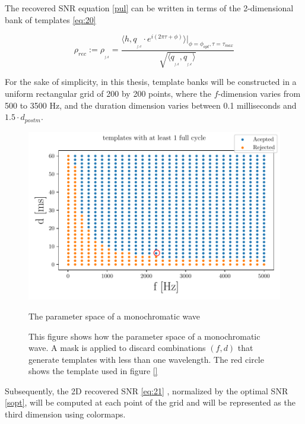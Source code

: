 The recovered SNR equation \ref{pul} can be written in terms of the 2-dimensional bank of templates \ref{eq:20}

\begin{equation}\label{eq:21}
\rho_{rec} := \rho_{_{_{f,d}}} = \frac{\langle h, q_{_{_{f,d}}}\cdot e^{i(2\pi \tau+\phi)}\rangle \bigg\rvert_{\phi =\phi_{opt},\tau =\tau_{max}}}{\sqrt{\langle  q_{_{_{f,d}}},q_{_{_{f,d}}} \rangle}}
\end{equation}


For the sake of simplicity, in this thesis, template banks will be constructed in a uniform rectangular grid of 200 by 200 points, where the $f$-dimension varies from 500 to 3500 Hz, and the duration dimension varies between 0.1 milliseconds and $1.5 \cdot d_{postm}$. 

\begin{figure}[!htb]
\centering
\includegraphics[scale=0.8]{images/Data_analysis/results/param_space.pdf}
\captionsetup{width=0.8\textwidth}
\caption{The parameter space of a monochromatic wave}
\caption*{This figure shows how the parameter space of a monochromatic wave. A mask is applied to discard combinations $(f,d)$ that generate templates with less than one wavelength. The red circle shows the template used in figure \ref{}}
\end{figure}
\FloatBarrier


Subsequently, the 2D recovered SNR \ref{eq:21} , normalized by the optimal SNR \ref{sopt}, will be computed at each point of the grid and will be represented as the third dimension using colormaps. 


